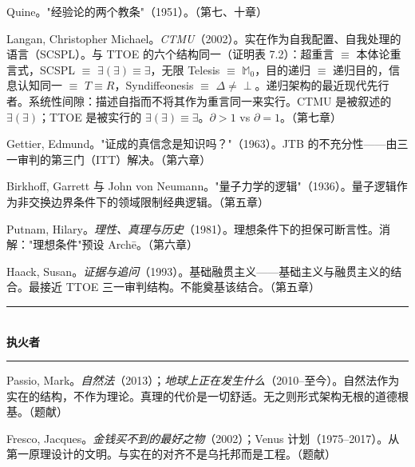 \documentclass[10pt, openany, oneside]{book}
\renewcommand{\normalsize}{\fontsize{10}{13}\selectfont}
\renewcommand{\footnotesize}{\fontsize{8.5}{11}\selectfont}
\begin{document}
{\vspace{0.3em}

\noindent Quine。"经验论的两个教条"（1951）。（第七、十章）

\vspace{0.3em}

\noindent Langan, Christopher Michael。\textit{CTMU}（2002）。实在作为自我配置、自我处理的语言（SCSPL）。与 TTOE 的六个结构同一（证明表 7.2）：超重言 $\equiv$ 本体论重言式，SCSPL $\equiv$ $\exists(\exists) \equiv \exists$，无限 Telesis $\equiv$ $\mathbb{M}_0$，目的递归 $\equiv$ 递归目的，信息认知同一 $\equiv$ $T \equiv R$，Syndiffeonesis $\equiv$ $\Delta \neq \perp$。递归架构的最近现代先行者。系统性间隙：描述自指而不将其作为重言同一来实行。CTMU 是被叙述的 $\exists(\exists)$；TTOE 是被实行的 $\exists(\exists) \equiv \exists$。$\partial > 1$ vs $\partial = 1$。（第七章）

\vspace{0.3em}

\noindent Gettier, Edmund。"证成的真信念是知识吗？"（1963）。JTB 的不充分性——由三一审判的第三门（ITT）解决。（第六章）

\vspace{0.3em}

\noindent Birkhoff, Garrett 与 John von Neumann。"量子力学的逻辑"（1936）。量子逻辑作为非交换边界条件下的领域限制经典逻辑。（第五章）

\vspace{0.3em}

\noindent Putnam, Hilary。\textit{理性、真理与历史}（1981）。理想条件下的担保可断言性。消解："理想条件"预设 Arch\={e}。（第六章）

\vspace{0.3em}

\noindent Haack, Susan。\textit{证据与追问}（1993）。基础融贯主义——基础主义与融贯主义的结合。最接近 TTOE 三一审判结构。不能奠基该结合。（第五章）

}

\vspace{1.5em}

\begin{center}
    \rule{0.3\textwidth}{0.4pt}\\[0.5em]
    {\normalsize\bfseries\scshape 执火者}\\[0.3em]
    \rule{0.3\textwidth}{0.4pt}
\end{center}

\vspace{1em}

{\footnotesize

\noindent Passio, Mark。\textit{自然法}（2013）；\textit{地球上正在发生什么}（2010--至今）。自然法作为实在的结构，不作为理论。真理的代价是一切舒适。无之则形式架构无根的道德根基。（题献）

\vspace{0.3em}

\noindent Fresco, Jacques。\textit{金钱买不到的最好之物}（2002）；Venus 计划（1975--2017）。从第一原理设计的文明。与实在的对齐不是乌托邦而是工程。（题献）

}
\end{document}

